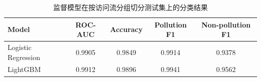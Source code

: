 \begin{table}[t]
\centering
\caption{监督模型在按访问流分组切分测试集上的分类结果}
\label{tab:ml-training-results}
\begin{tabular}{lcccc}
\toprule
Model & ROC-AUC & Accuracy & Pollution F1 & Non-pollution F1 \\
\midrule
Logistic Regression & 0.9905 & 0.9849 & 0.9914 & 0.9378 \\
LightGBM & 0.9912 & 0.9896 & 0.9941 & 0.9562 \\
\bottomrule
\end{tabular}
\end{table}
